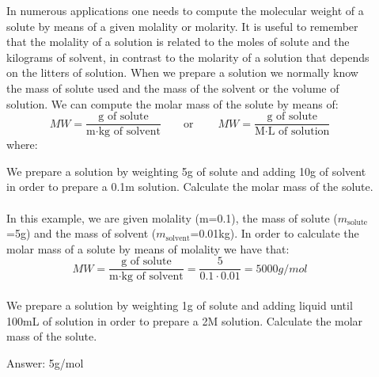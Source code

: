 \documentclass[main.tex]{subfiles}
\newcommand\chapterlabel{physicalsolutions}
\begin{document}
\begin{description}
\item[] 
In numerous applications one needs to compute the molecular weight of a solute by means of a given molality or molarity. It is useful to remember that the molality of a solution is related to the moles of solute and the kilograms of solvent, in contrast to the molarity of a solution that depends on the litters of solution. When we prepare a solution we normally know the mass of solute used and the mass of the solvent or the volume of solution. We can compute the molar mass of the solute by means of:
\begin{equation}
\boxed{ MW=\frac{ \text{g of solute}   }{\text{m}\cdot \text{kg of solvent}   	}}
\quad\quad\text{or} \quad\quad\
\boxed{ MW=\frac{ \text{g of solute}   }{\text{M}\cdot \text{L of solution}}}
\label{\chapterlabel:equation17}
\end{equation}
where:
\begin{example} %
We prepare a solution by weighting 5g of solute and adding 10g of solvent in order to prepare a 0.1m solution. Calculate the molar mass of the solute.
\\
 \\
In this example, we are given molality (m=0.1), the mass of solute ($m_{\text{solute}}$=5g) and the mass of solvent ($m_{\text{solvent}}$=0.01kg). In order to calculate the molar mass of a solute by means of molality we have that:
 \[MW=\frac{ \text{g of solute}   }{\text{m}\cdot \text{kg of solvent}   	}=\frac{5}{0.1\cdot 0.01}=5000g/mol \]
 \faDiamond\ \textlcsc{ \textcolor{dgreen}{\Large \textbf{Study Check}} }\\
We prepare a solution by weighting 1g of solute and adding liquid until 100mL of solution in order to prepare a 2M solution. Calculate the molar mass of the solute.
\\
\begin{flushright} Answer: 5g/mol\end{flushright}
\end{example}%





\end{description}
\end{document}
